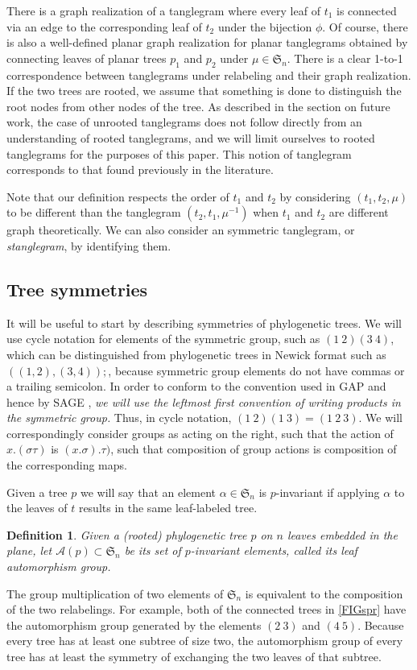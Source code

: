 \documentclass{amsart}
\newtheorem{definition}{Definition}
\newcommand{\fS}{\mathfrak S}
\newcommand{\aut}{\mathcal A}
\newcommand{\pairing}{\mu}
\begin{document}
There is a graph realization of a tanglegram where every leaf of $t_1$ is connected via an edge to the corresponding leaf of $t_2$ under the bijection $\phi$.
Of course, there is also a well-defined planar graph realization for planar tanglegrams obtained by connecting leaves of planar trees $p_1$ and $p_2$ under $\pairing \in \fS_n$.
There is a clear 1-to-1 correspondence between tanglegrams under relabeling and their graph realization.
If the two trees are rooted, we assume that something is done to distinguish the root nodes from other nodes of the tree.
As described in the section on future work, the case of unrooted tanglegrams does not follow directly from an understanding of rooted tanglegrams, and we will limit ourselves to rooted tanglegrams for the purposes of this paper.
This notion of tanglegram corresponds to that found previously in the literature.

Note that our definition respects the order of $t_1$ and $t_2$ by considering $(t_1, t_2, \pairing)$ to be different than the tanglegram $(t_2, t_1, \pairing^{-1})$ when $t_1$ and $t_2$ are different graph theoretically.
We can also consider an symmetric tanglegram, or \emph{stanglegram}, by identifying them.


\subsection{Tree symmetries}
It will be useful to start by describing symmetries of phylogenetic trees.
We will use cycle notation for elements of the symmetric group, such as $(1\ 2) (3\ 4)$, which can be distinguished from phylogenetic trees in Newick format \cite{wiki:newick} such as $((1,2),(3,4));$, because symmetric group elements do not have commas or a trailing semicolon.
In order to conform to the convention used in GAP \cite{GAP4} and hence by SAGE \cite{SteinJoyner2005}, \emph{we will use the leftmost first convention of writing products in the symmetric group.}
Thus, in cycle notation, $(1\ 2) (1\ 3) = (1\ 2\ 3)$.
We will correspondingly consider groups as acting on the right, such that the action of $x.(\sigma \tau)$ is $(x.\sigma).\tau)$, such that composition of group actions is composition of the corresponding maps.

Given a tree $p$ we will say that an element $\alpha \in \fS_n$ is $p$-invariant if applying $\alpha$ to the leaves of $t$ results in the same leaf-labeled tree.
\begin{definition}
Given a (rooted) phylogenetic tree $p$ on $n$ leaves embedded in the plane, let $\aut(p) \subset \fS_n$ be its set of $p$-invariant elements, called its leaf automorphism group.
\end{definition}
The group multiplication of two elements of $\fS_n$ is equivalent to the composition of the two relabelings.
For example, both of the connected trees in \ref{FIGspr} have the automorphism group generated by the elements $(2\ 3)$ and $(4\ 5)$.
Because every tree has at least one subtree of size two, the automorphism group of every tree has at least the symmetry of exchanging the two leaves of that subtree.
\end{document}

